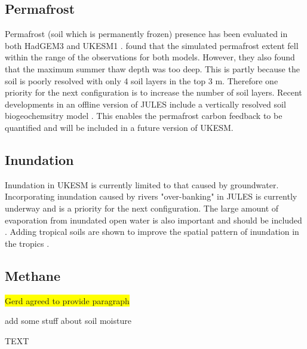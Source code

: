 \documentclass[bg, manuscript]{copernicus}
\newcommand{\hilight}[1]{\colorbox{yellow}{#1}}
\begin{document}
\subsection{Permafrost}
Permafrost (soil which is permanently frozen) presence has been evaluated in both HadGEM3 and UKESM1 \citep{Sellar2019-bo,burke2020evaluating}. \cite{burke2020evaluating} found that the simulated permafrost extent fell within the range of the observations for both models. However, they also found that the maximum summer thaw depth was too deep. This is partly because the soil is poorly resolved with only 4 soil layers in the top 3 m. Therefore one priority for the next configuration is to increase the number of soil layers. Recent developments in an offline version of JULES include a vertically resolved soil biogeochemsitry model \citep{wiltshire2020jules,burke2017vertical}. This enables the permafrost carbon feedback to be quantified \citep{burke2017quantifying} and will be included in a future version of UKESM.

\subsection{Inundation}
Inundation in UKESM is currently limited to that caused by groundwater. Incorporating inundation caused by rivers "over-banking" in JULES is currently underway  \citep{Dadson2010,Lewis2018} and is a priority for the next configuration. The large amount of evaporation from inundated open water is also important and should be included \citep{Dadson2010}. Adding tropical soils are shown to improve the spatial pattern of inundation in the tropics \citep{Gedney2019}.


\subsection{Methane}
\hilight{Gerd agreed to provide paragraph}

add some stuff about soil moisture

\conclusions  %
TEXT


\end{document}
